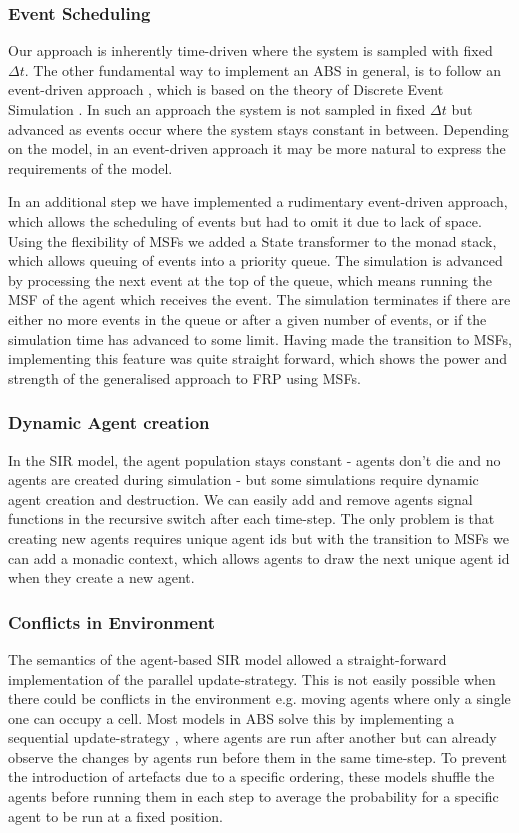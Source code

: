 \subsubsection{Event Scheduling}
Our approach is inherently time-driven where the system is sampled with fixed $\Delta t$. The other fundamental way to implement an ABS in general, is to follow an event-driven approach \cite{meyer_event-driven_2014}, which is based on the theory of Discrete Event Simulation \cite{zeigler_theory_2000}. In such an approach the system is not sampled in fixed $\Delta t$ but advanced as events occur where the system stays constant in between. Depending on the model, in an event-driven approach it may be more natural to express the requirements of the model.

In an additional step we have implemented a rudimentary event-driven approach, which allows the scheduling of events but had to omit it due to lack of space. Using the flexibility of MSFs we added a State transformer to the monad stack, which allows queuing of events into a priority queue. The simulation is advanced by processing the next event at the top of the queue, which means running the MSF of the agent which receives the event. The simulation terminates if there are either no more events in the queue or after a given number of events, or if the simulation time has advanced to some limit. Having made the transition to MSFs, implementing this feature was quite straight forward, which shows the power and strength of the generalised approach to FRP using MSFs.

\subsubsection{Dynamic Agent creation}
In the SIR model, the agent population stays constant - agents don't die and no agents are created during simulation - but some simulations \cite{epstein_growing_1996} require dynamic agent creation and destruction. We can easily add and remove agents signal functions in the recursive switch after each time-step. The only problem is that creating new agents requires unique agent ids but with the transition to MSFs we can add a monadic context, which allows agents to draw the next unique agent id when they create a new agent. 

\subsubsection{Conflicts in Environment}
The semantics of the agent-based SIR model allowed a straight-forward implementation of the parallel update-strategy. This is not easily possible when there could be conflicts in the environment e.g. moving agents where only a single one can occupy a cell. Most models in ABS \cite{epstein_growing_1996} solve this by implementing a sequential update-strategy \cite{thaler_art_2017}, where agents are run after another but can already observe the changes by agents run before them in the same time-step. To prevent the introduction of artefacts due to a specific ordering, these models shuffle the agents before running them in each step to average the probability for a specific agent to be run at a fixed position.

